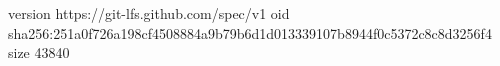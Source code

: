 version https://git-lfs.github.com/spec/v1
oid sha256:251a0f726a198cf4508884a9b79b6d1d013339107b8944f0c5372c8c8d3256f4
size 43840

